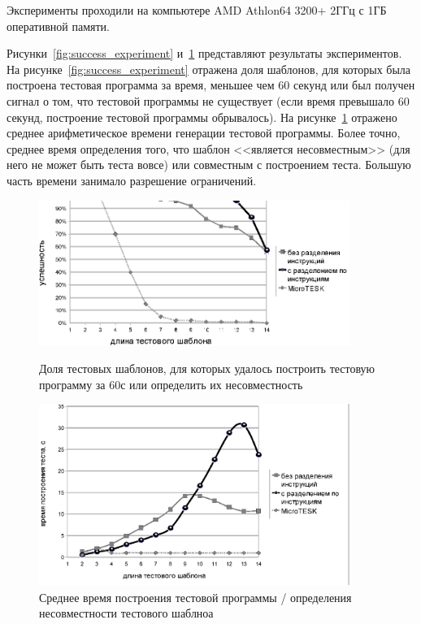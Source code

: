 Эксперименты проходили на компьютере AMD Athlon64 3200+ 2ГГц с 1ГБ оперативной памяти.

Рисунки~\ref{fig:success_experiment} и~\ref{fig:time_experiment} представляют
результаты экспериментов. На рисунке~\ref{fig:success_experiment} отражена доля
шаблонов, для которых была построена тестовая программа за время, меньшее чем 60 секунд или был получен сигнал о том, что тестовой программы не существует (если время превышало 60 секунд, построение тестовой программы обрывалось). На рисунке~\ref{fig:time_experiment} отражено среднее арифметическое времени генерации тестовой программы. Более точно, среднее время определения того, что шаблон <<является несовместным>> (для него не может быть теста вовсе) или
совместным с построением теста. Большую часть времени занимало разрешение ограничений.


\begin{figure}[p] \center
\parbox[t]{0.9\textwidth}{
  \includegraphics[width=0.9\textwidth]{4.analysis/success_exprmnt}%
\caption{Доля тестовых шаблонов, для которых удалось построить тестовую программу за 60с или определить их несовместность}\label{fig:success_experiment}
}

\vspace{1.5cm}

\parbox[t]{0.9\textwidth}{
  \includegraphics[width=0.9\textwidth]{4.analysis/time_exprmnt}
  \caption{Среднее время построения тестовой программы / определения несовместности тестового шаблноа}\label{fig:time_experiment}
}
\end{figure}

